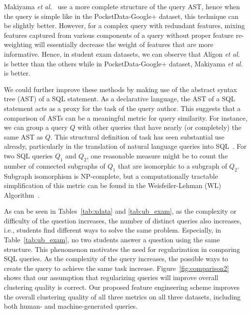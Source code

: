 Makiyama \textit{et al.}~\cite{makiyama2015text} use a more complete structure of the query AST, hence when the query is simple like in the PocketData-Google+ dataset, this technique can be slightly better.
However, for a complex query with redundant features, mixing features captured from various components of a query without proper feature re-weighting will essentially decrease the weight of features that are more informative.
Hence, in student exam datasets, we can observe that Aligon \textit{et al.}~\cite{aligon2014similarity} is better than the others while in PocketData-Google+ dataset, Makiyama \textit{et al.}~\cite{makiyama2015text} is better.

We could further improve these methods by making use of the abstract syntax tree (AST) of a SQL statement.
As a declarative language, the AST of a SQL statement acts as a proxy for the task of the query author.
This suggests that a comparison of ASTs can be a meaningful metric for query similarity.
For instance, we can group a query $Q$ with other queries that have nearly (or completely) the same AST as $Q$.
This structural definition of task has seen substantial use already, particularly in the translation of natural language queries into SQL~\cite{li2015NLPI}.
For two SQL queries $Q_1$ and $Q_2$, one reasonable measure might be to count the number of connected subgraphs of $Q_1$ that are isomorphic to a subgraph of $Q_2$.  
Subgraph isomorphism is NP-complete, but a computationally tractable simplification of this metric can be found in the Weisfeiler-Lehman (WL) Algorithm~\cite{WL2011, kul2016ettu}.

As can be seen in Tables~\ref{tab:xdata} and \ref{tab:ub_exam}, as the complexity or difficulty of the question increases, the number of distinct queries also increases, i.e., students find different ways to solve the same problem.
Especially, in Table~\ref{tab:ub_exam}, no two students answer a question using the same structure.
This phenomenon motivates the need for regularization in comparing SQL queries.
As the complexity of the query increases, the possible ways to create the query to achieve the same task increase.
Figure~\ref{fig:comparison2} shows that our assumption that regularizing queries will improve overall clustering quality is correct.
Our proposed feature engineering scheme improves the overall clustering quality of all three metrics on all three datasets, including both human- and machine-generated queries.


